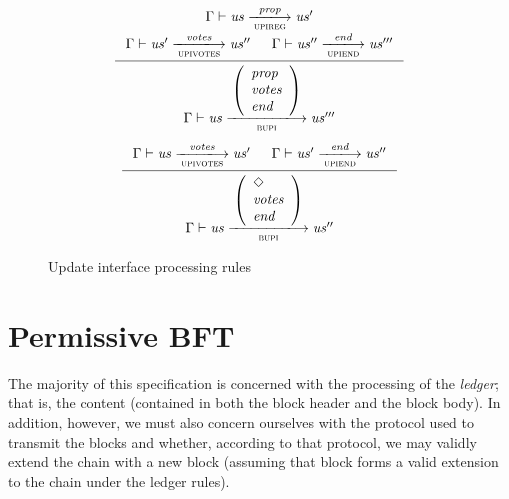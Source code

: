 \documentclass[11pt,a4paper]{article}
\newcommand{\var}[1]{\mathit{#1}}
\newcommand{\trans}[2]{\xlongrightarrow[\textsc{#1}]{#2}}
\newcommand{\Nothing}{\Diamond}
\begin{document}
\begin{figure}[ht]
  \begin{equation*}
    \inference
    { \Gamma \vdash \var{us} \trans{upireg}{\var{prop}} \var{us'}
      \\
      \Gamma \vdash \var{us'} \trans{upivotes}{\var{votes}} \var{us''}
      &
      \Gamma \vdash \var{us''} \trans{upiend}{\var{end}} \var{us'''}
    }
    {
      \Gamma \vdash
      {\var{us}}
      \trans{bupi}
      {
        \left(
          \begin{array}{l}
            \var{prop} \\
            \var{votes} \\
            \var{end}
          \end{array}
        \right)
      }
      {\var{us'''}}
    }
  \end{equation*}
  \vspace{20pt}
  \begin{equation*}
    \inference
    { \Gamma \vdash \var{us} \trans{upivotes}{\var{votes}} \var{us'}
      &
      \Gamma \vdash \var{us'} \trans{upiend}{\var{end}} \var{us''}
    }
    {
      \Gamma \vdash \var{us}
      \trans{bupi}{
        \left(
          \begin{array}{l}
            \Nothing \\
            \var{votes} \\
            \var{end}
          \end{array}
        \right)
      }
      \var{us''}
    }
  \end{equation*}
  \caption{Update interface processing rules}
  \label{fig:rules:bupi}
\end{figure}

\clearpage
\section{Permissive BFT}

The majority of this specification is concerned with the processing of the
\textit{ledger}; that is, the content (contained in both the block header and
the block body). In addition, however, we must also concern ourselves with the
protocol used to transmit the blocks and whether, according to that protocol, we
may validly extend the chain with a new block (assuming that block forms a valid
extension to the chain under the ledger rules).
\end{document}
